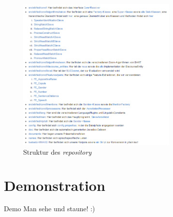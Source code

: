 \documentclass[11pt,a4paper]{beamer}
\begin{document}
\begin{frame}
\begin{figure}
\begin{center}
\includegraphics[width=8cm]{repository_structure.png}
\caption{Struktur des \textit{repository}}
\label{fig:repository}
\end{center}
\end{figure}
\end{frame}

\section{Demonstration}
\begin{frame}{Demo}
Man sehe und staune! :)
\end{frame}
\end{document}
